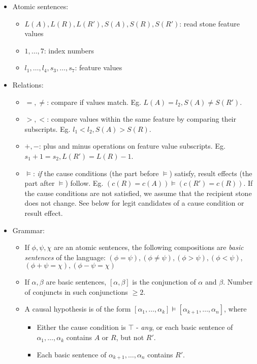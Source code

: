 \documentclass[11pt]{article}
\begin{document}
\begin{itemize}
\item Atomic sentences:
	\begin{itemize}
		\item $L(A), L(R), L(R'), S(A), S(R), S(R')$: read stone feature values
		\item $1, \ldots, 7$: index numbers
		\item $l_1, \ldots, l_4, s_3, \ldots, s_7$: feature values
	\end{itemize}
\item Relations:
	\begin{itemize}
		\item $=, \neq$: compare if values match. Eg. 
					$L(A) = l_2, S(A) \neq S(R')$.
		\item $>, <$: compare values within the same feature by comparing their subscripts. 
					Eg. $l_1 < l_2, S(A) > S(R)$.
		\item $+, -$: plus and minus operations on feature value subscripts.
		 			Eg. $s_1 + 1 = s_2, L(R') = L(R) - 1$.
		\item $\models$: \textit{if} the cause conditions (the part before $\models$) satisfy, result effects (the part after $\models$) follow.
					Eg. $(c(R) = c(A)) \models (c(R') = c(R))$.
			If the cause conditions are not satisfied, we assume that the recipient stone does not change. 
			See below for legit candidates of a cause condition or result effect.
	\end{itemize}

\newpage
\item Grammar:
	\begin{itemize}
		\item If $\phi, \psi, \chi$ are an atomic sentences, the following compositions are \textit{basic sentences} of the language:
			$(\phi = \psi), (\phi \neq \psi), (\phi > \psi), (\phi < \psi)$,
			$(\phi + \psi = \chi), (\phi - \psi = \chi)$
		\item If $\alpha, \beta$ are basic sentences, $[\alpha, \beta]$ is the conjunction of $\alpha$ and $\beta$. 
			Number of conjuncts in such conjunctions $\geq 2$. 
		\item A causal hypothesis is of the form $[\alpha_1, \ldots, \alpha_k] \models [\alpha_{k + 1}, \ldots, \alpha_n]$, where
			\begin{itemize}
				\item Either the cause condition is $\top$ - \textit{any}, or each basic sentence of $\alpha_1, \ldots, \alpha_k$ contains $A$ or $R$, but not $R'$.
				\item Each basic sentence of $\alpha_{k + 1}, \ldots, \alpha_n$ contains $R'$.
			\end{itemize}
	\end{itemize}
\end{itemize}
\end{document}
